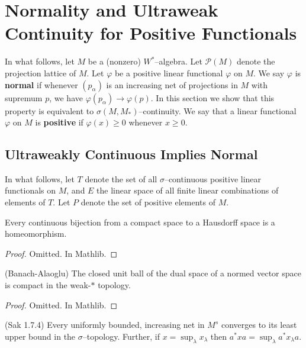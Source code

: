 \chapter{Normality and Ultraweak Continuity for Positive Functionals}

In what follows, let $M$ be a (nonzero) $W^{*}$--algebra. Let $\mathcal{P}(M)$
denote the projection lattice of $M$. Let $\varphi$ be a positive linear functional $\varphi$ on $M$.
We say $\varphi$ is \textbf{normal} if whenever $(p_{\alpha})$ is an increasing net of projections in $M$ with supremum $p$,
we have $\varphi(p_{\alpha})\to \varphi(p)$. In this section we show that this property is equivalent to
$\sigma(M, M_{*})$--continuity. We say that a linear functional $\varphi$ on $M$
is \textbf{positive} if $\varphi(x)\ge 0$ whenever $x\ge 0$.

\section{Ultraweakly Continuous Implies Normal}

In what follows, let $T$ denote the set of all $\sigma$--continuous positive
linear functionals on $M$, and $E$ the linear space of all finite linear combinations
of elements of $T$. Let $P$ denote the set of positive elements of $M$.

\begin{lemma}
  \label{lem:homeo_of_cts_bij_cpt_haus}
  \mathlibok
  Every continuous bijection from a compact space to a Hausdorff space is a
  homeomorphism.
\end{lemma}

\begin{proof}
  \leanok
  Omitted. In Mathlib.
\end{proof}

\begin{theorem}
  \label{thm:Banach_Alaoglu}
  \mathlibok
  (Banach-Alaoglu) The closed unit ball of the dual space of a normed vector space is compact in the
  weak-$*$ topology.
\end{theorem}

\begin{proof}
  \leanok
  Omitted. In Mathlib.
\end{proof}

\begin{theorem}
  \label{lem:sigma_cont_of_normal_Sak_1_7_4} (Sak 1.7.4)
  \leanok
  Every uniformly bounded, increasing net in $M^{s}$ converges
  to its least upper bound in the $\sigma$--topology. Further, if
  $x=\sup_{\lambda}x_{\lambda}$ then $a^{*}xa=\sup_{\lambda}a^{*}x_{\lambda}a$.
\end{theorem}

